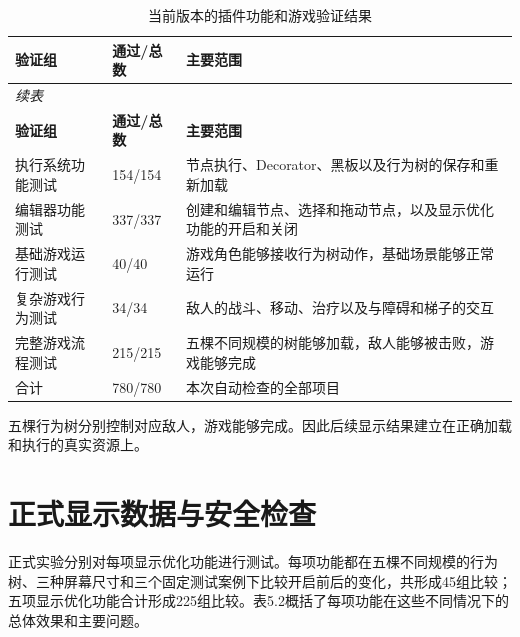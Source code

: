 \documentclass[11pt,a4paper,oneside,extrafontsizes]{memoir}
\begin{document}
\begin{center}

\begin{longtable}{@{}p{} p{} p{}@{}}
\caption{当前版本的插件功能和游戏验证结果}\label{tab:function-game-validation}\\
\toprule
\textbf{验证组} & \textbf{通过/总数} & \textbf{主要范围} \\
\midrule
\endfirsthead
\multicolumn{3}{l}{\itshape 续表}\\
\toprule
\textbf{验证组} & \textbf{通过/总数} & \textbf{主要范围} \\
\midrule
\endhead
执行系统功能测试 & 154/154 & 节点执行、Decorator、黑板以及行为树的保存和重新加载 \\
编辑器功能测试 & 337/337 & 创建和编辑节点、选择和拖动节点，以及显示优化功能的开启和关闭 \\
基础游戏运行测试 & 40/40 & 游戏角色能够接收行为树动作，基础场景能够正常运行 \\
复杂游戏行为测试 & 34/34 & 敌人的战斗、移动、治疗以及与障碍和梯子的交互 \\
完整游戏流程测试 & 215/215 & 五棵不同规模的树能够加载，敌人能够被击败，游戏能够完成 \\
合计 & 780/780 & 本次自动检查的全部项目 \\
\bottomrule
\end{longtable}
\end{center}

五棵行为树分别控制对应敌人，游戏能够完成。因此后续显示结果建立在正确加载和执行的真实资源上。

\section{正式显示数据与安全检查}

正式实验分别对每项显示优化功能进行测试。每项功能都在五棵不同规模的行为树、三种屏幕尺寸和三个固定测试案例下比较开启前后的变化，共形成45组比较；五项显示优化功能合计形成225组比较。表5.2概括了每项功能在这些不同情况下的总体效果和主要问题。
\end{document}

